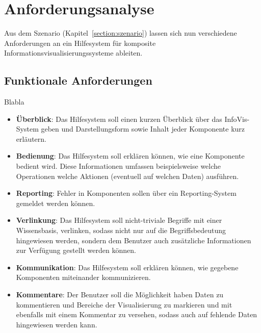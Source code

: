 \documentclass[
	headsepline,
	footsepline,
	fontsize=12pt,
	bibliography=totoc
]{scrbook}
\begin{document}
\section{Anforderungsanalyse}
\label{section:anforderungsanalyse}

Aus dem Szenario (Kapitel~\ref{section:szenario}) lassen sich nun verschiedene Anforderungen an ein Hilfesystem für komposite Informationsvisualisierungssysteme ableiten.

\subsection{Funktionale Anforderungen}
\label{section:funktionale_anforderungen}

Blabla

\begin{itemize}
	\item\textbf{Überblick}: Das Hilfesystem soll einen kurzen Überblick über das InfoVis-System geben und Darstellungsform sowie Inhalt jeder Komponente kurz erläutern.
	\item\textbf{Bedienung}: Das Hilfesystem soll erklären können, wie eine Komponente bedient wird. Diese Informationen umfassen beispielsweise welche Operationen welche Aktionen (eventuell auf welchen Daten) ausführen.
	\item\textbf{Reporting}: Fehler in Komponenten sollen über ein Reporting-System gemeldet werden können.
	\item\textbf{Verlinkung}: Das Hilfesystem soll nicht-triviale Begriffe mit einer Wissensbasis‚ verlinken, sodass nicht nur auf die Begriffsbedeutung hingewiesen werden, sondern dem Benutzer auch zusätzliche Informationen zur Verfügung gestellt werden können.
	\item\textbf{Kommunikation}: Das Hilfesystem soll erklären können, wie gegebene Komponenten miteinander kommunizieren.
	\item\textbf{Kommentare}: Der Benutzer soll die Möglichkeit haben Daten zu kommentieren und Bereiche der Visualisierung zu markieren und mit ebenfalls mit einem Kommentar zu versehen, sodass auch auf fehlende Daten hingewiesen werden kann.
\end{itemize}

\end{document}
